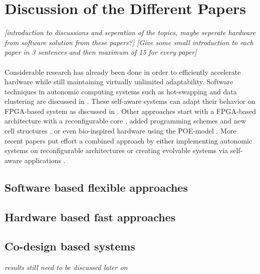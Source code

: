 
\section{Discussion of the Different Papers}
\label{sec:discussion}

\emph{[introduction to discussions and seperation of the topics, maybe seperate hardware from software solution from these papers?]
[Give some small introduction to each paper in 3 sentences and then maximum of 15 for every paper]}
\\
\\
Considerable research has already been done in order to efficiently accelerate hardware while still maintaining virtually unlimited adaptability. 
Software techniques in autonomic computing systems such as hot-swapping and data clustering are discussed in \cite{survey}. 
These self-aware systems can adapt their behavior on FPGA-based system as discussed in \cite{selfaware}.
Other approaches start with a FPGA-based architecture with a reconfigurable core \cite{drp},  added programming schemes and new cell structures \cite{virtex4}, \cite{erlangen} or even bio-inspired hardware using the POE-model \cite{poe}.
More recent papers put effort a combined approach by either implementing autonomic systems on reconfigurable architectures \cite{reconfigurable} or creating evolvable systems via self-aware applications \cite{evolvable}.


\subsection{Software based flexible approaches}
\label{sec:software}



\subsection{Hardware based fast approaches}
\label{sec:hardware}


\subsection{Co-design based systems}
\label{sec:codesign}






\emph{results still need to be discussed later on}
